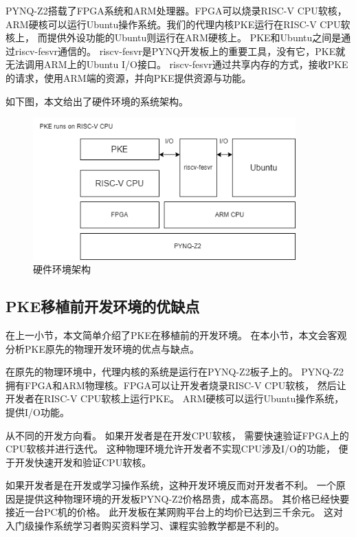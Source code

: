PYNQ-Z2搭载了FPGA系统和ARM处理器。FPGA可以烧录RISC-V CPU软核，
ARM硬核可以运行Ubuntu操作系统。我们的代理内核PKE运行在RISC-V CPU软核上，
而提供外设功能的Ubuntu则运行在ARM硬核上。
PKE和Ubuntu之间是通过riscv-fesvr通信的。
riscv-fesvr是PYNQ开发板上的重要工具，没有它，PKE就无法调用ARM上的Ubuntu I/O接口。
riscv-fesvr通过共享内存的方式，接收PKE的请求，使用ARM端的资源，并向PKE提供资源与功能。

如下图，本文给出了硬件环境的系统架构。

\begin{figure}[htbp]
    \vspace{13pt} %
    \centering
    \includegraphics[width=0.9\textwidth]{images/pke_hardware_env.drawio.png}
    \caption{硬件环境架构}\label{硬件环境架构} %
\end{figure}

\subsection{PKE移植前开发环境的优缺点}

在上一小节，本文简单介绍了PKE在移植前的开发环境。
在本小节，本文会客观分析PKE原先的物理开发环境的优点与缺点。

在原先的物理环境中，代理内核的系统是运行在PYNQ-Z2板子上的。
PYNQ-Z2拥有FPGA和ARM物理核。FPGA可以让开发者烧录RISC-V CPU软核，
然后让开发者在RISC-V CPU软核上运行PKE。
ARM硬核可以运行Ubuntu操作系统，提供I/O功能。

从不同的开发方向看。
如果开发者是在开发CPU软核，
需要快速验证FPGA上的CPU软核并进行迭代。
这种物理环境允许开发者不实现CPU涉及I/O的功能，
便于开发快速开发和验证CPU软核。

如果开发者是在开发或学习操作系统，这种开发环境反而对开发者不利。
一个原因是提供这种物理环境的开发板PYNQ-Z2价格昂贵，成本高昂。
其价格已经快要接近一台PC机的价格。
此开发板在某网购平台上的均价已达到三千余元。
这对入门级操作系统学习者购买资料学习、课程实验教学都是不利的。


